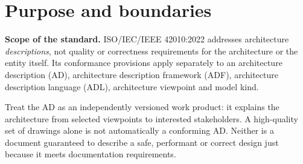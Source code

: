 \documentclass[11pt,letterpaper]{article}
\begin{document}
\InterpretationKey
\section{Purpose and boundaries}
\begin{Requirement}
\FlagReq{} \textbf{Scope of the standard.} ISO/IEC/IEEE 42010:2022 addresses architecture \emph{descriptions}, not quality or correctness requirements for the architecture or the entity itself. Its conformance provisions apply separately to an architecture description (AD), architecture description framework (ADF), architecture description language (ADL), architecture viewpoint and model kind. 
\end{Requirement}
\begin{Guidance}Treat the AD as an independently versioned work product: it explains the architecture from selected viewpoints to interested stakeholders. A high-quality set of drawings alone is not automatically a conforming AD. Neither is a document guaranteed to describe a safe, performant or correct design just because it meets documentation requirements.\end{Guidance}
\end{document}
